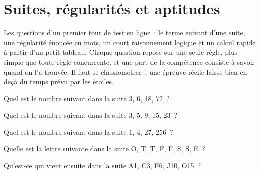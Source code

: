 \chapter{Suites, régularités et aptitudes}\label{ch:iv1:sequences-patterns-and-aptitude}

\begin{ivtrains}
Les questions d'un premier tour de test en ligne~: le terme suivant d'une suite, une régularité énoncée en mots, un court raisonnement logique et un calcul rapide à partir d'un petit tableau. Chaque question repose sur une seule règle, plus simple que toute règle concurrente, et une part de la compétence consiste à savoir quand on l'a trouvée. Il faut se chronométrer~: une épreuve réelle laisse bien en deçà du temps prévu par les étoiles.
\end{ivtrains}

\begin{question}\label{iq:iv1:sequences-patterns-and-aptitude:1}
Quel est le nombre suivant dans la suite 3, 6, 18, 72~?
\end{question}

\begin{question}\label{iq:iv1:sequences-patterns-and-aptitude:2}
Quel est le nombre suivant dans la suite 3, 5, 9, 15, 23~?
\end{question}

\begin{question}\label{iq:iv1:sequences-patterns-and-aptitude:3}
Quel est le nombre suivant dans la suite 1, 4, 27, 256~?
\end{question}

\begin{question}\label{iq:iv1:sequences-patterns-and-aptitude:4}
Quelle est la lettre suivante dans la suite O, T, T, F, F, S, S, E~?
\end{question}

\begin{question}\label{iq:iv1:sequences-patterns-and-aptitude:5}
Qu'est-ce qui vient ensuite dans la suite A1, C3, F6, J10, O15~?
\end{question}

